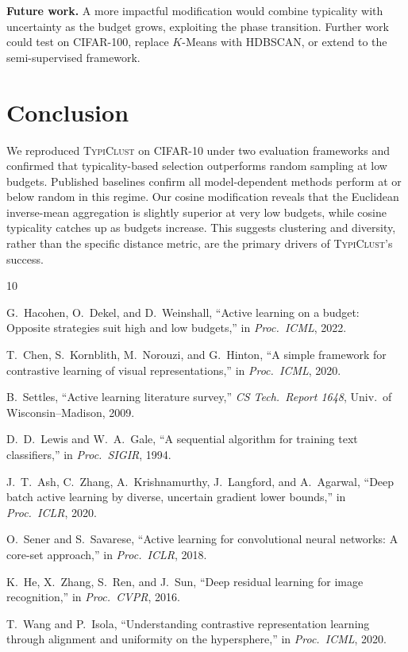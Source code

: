 \documentclass[10pt, conference, twocolumn]{IEEEtran}
\newcommand{\typiclust}{\textsc{TypiClust}}
\begin{document}
\smallskip\noindent\textbf{Future work.}\quad
A more impactful modification would combine typicality with uncertainty
as the budget grows, exploiting the phase transition.  Further work
could test on CIFAR-100, replace $K$-Means with HDBSCAN, or extend to
the semi-supervised framework.

\section{Conclusion}
\label{sec:conclusion}

We reproduced \typiclust{} on CIFAR-10 under two evaluation frameworks
and confirmed that typicality-based selection outperforms random
sampling at low budgets.  Published baselines confirm all
model-dependent methods perform at or below random in this regime.
Our cosine modification reveals that the Euclidean inverse-mean
aggregation is slightly superior at very low budgets, while cosine
typicality catches up as budgets increase.  This suggests clustering
and diversity, rather than the specific distance metric, are the
primary drivers of \typiclust{}'s success.




\begin{thebibliography}{10}

G.~Hacohen, O.~Dekel, and D.~Weinshall,
``Active learning on a budget: Opposite strategies suit high and low budgets,''
in \emph{Proc.\ ICML}, 2022.

T.~Chen, S.~Kornblith, M.~Norouzi, and G.~Hinton,
``A simple framework for contrastive learning of visual representations,''
in \emph{Proc.\ ICML}, 2020.

B.~Settles,
``Active learning literature survey,''
\emph{CS Tech.\ Report 1648}, Univ.\ of Wisconsin--Madison, 2009.

D.~D.~Lewis and W.~A.~Gale,
``A sequential algorithm for training text classifiers,''
in \emph{Proc.\ SIGIR}, 1994.

J.~T.~Ash, C.~Zhang, A.~Krishnamurthy, J.~Langford, and A.~Agarwal,
``Deep batch active learning by diverse, uncertain gradient lower bounds,''
in \emph{Proc.\ ICLR}, 2020.

O.~Sener and S.~Savarese,
``Active learning for convolutional neural networks: A core-set approach,''
in \emph{Proc.\ ICLR}, 2018.

K.~He, X.~Zhang, S.~Ren, and J.~Sun,
``Deep residual learning for image recognition,''
in \emph{Proc.\ CVPR}, 2016.

T.~Wang and P.~Isola,
``Understanding contrastive representation learning through alignment
and uniformity on the hypersphere,''
in \emph{Proc.\ ICML}, 2020.

\end{thebibliography}
\end{document}
